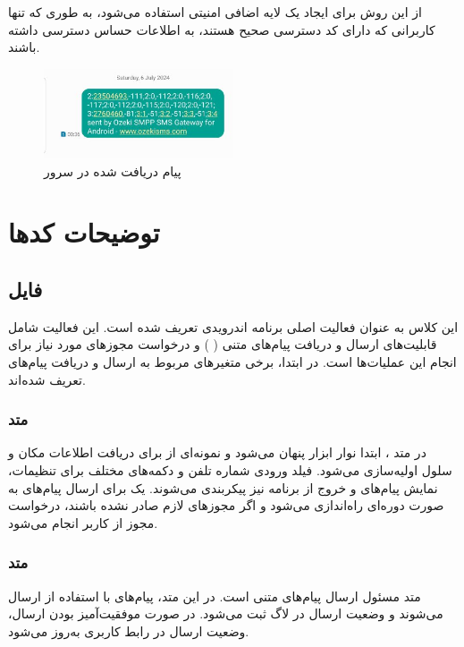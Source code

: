 \documentclass{report}
\begin{document}
از این روش برای ایجاد یک لایه اضافی امنیتی استفاده می‌شود، به طوری که تنها کاربرانی که دارای کد دسترسی صحیح هستند، به اطلاعات حساس دسترسی داشته باشند.

\begin{figure}[b]
	\centering
	\includegraphics[width=0.5\textwidth]{Pic/Message}
	\caption{پیام دریافت شده در سرور}
	\label{fig:Server}
\end{figure}
\chapter{توضیحات کدها}
\section{فایل
}
این کلاس
 به عنوان فعالیت اصلی برنامه اندرویدی تعریف شده است. این فعالیت شامل قابلیت‌های ارسال و دریافت پیام‌های متنی (
 ) و درخواست مجوزهای مورد نیاز برای انجام این عملیات‌ها است. در ابتدا، برخی متغیرهای مربوط به ارسال و دریافت پیام‌های
   تعریف شده‌اند.

\subsection{متد
}
در متد
 ، ابتدا نوار ابزار پنهان می‌شود و نمونه‌ای از
   برای دریافت اطلاعات مکان و سلول اولیه‌سازی می‌شود. فیلد ورودی شماره تلفن و دکمه‌های مختلف برای تنظیمات، نمایش پیام‌های 
    و خروج از برنامه نیز پیکربندی می‌شوند. یک
     برای ارسال پیام‌های 
      به صورت دوره‌ای راه‌اندازی می‌شود و اگر مجوزهای لازم صادر نشده باشند، درخواست مجوز از کاربر انجام می‌شود.

\subsection{متد
	}
متد
  مسئول ارسال پیام‌های متنی است. در این متد، پیام‌های
   با استفاده از
    ارسال می‌شوند و وضعیت ارسال در لاگ ثبت می‌شود. در صورت موفقیت‌آمیز بودن ارسال، وضعیت ارسال در رابط کاربری به‌روز می‌شود.
\end{document}
